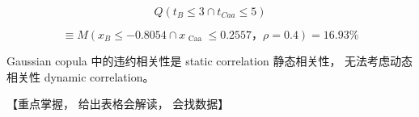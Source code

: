     
    \[
    Q\left( {{t}_{B} \leq  3 \cap  {t}_{Caa} \leq  5}\right)
    \]
    
    \[
    \equiv  M\left( {{x}_{B} \leq   - {0.8054} \cap  {x}_{\text{ Caa }} \leq  {0.2557}，\rho  = {0.4}}\right)  = {16.93}\%
    \]
    
    
    
    Gaussian copula 中的违约相关性是 static correlation 静态相关性， 无法考虑动态相关性 dynamic correlation。
    
    【重点掌握， 给出表格会解读， 会找数据】
    












